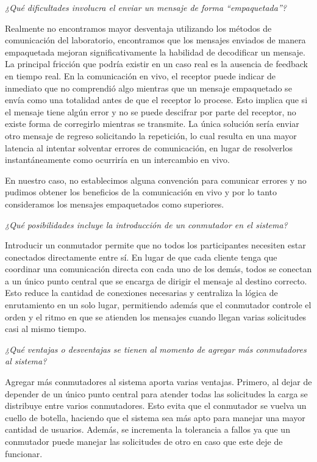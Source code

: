 \documentclass[11pt]{article}
\begin{document}
\textit{¿Qué dificultades involucra el enviar un mensaje de forma ``empaquetada''?}

Realmente no encontramos mayor desventaja utilizando los métodos de comunicación del laboratorio, encontramos que los mensajes enviados
de manera empaquetada mejoran significativamente la habilidad de decodificar un mensaje. La principal fricción que podría existir
en un caso real es la ausencia de feedback en tiempo real. En la comunicación en vivo, el receptor puede indicar de
inmediato que no comprendió algo mientras que un mensaje empaquetado se envía como una totalidad antes de que el receptor lo procese.
Esto implica que si el mensaje tiene algún error y no se puede descifrar por parte del receptor, no existe forma de corregirlo mientras se
transmite. La única solución sería enviar otro mensaje de regreso solicitando la repetición, lo
cual resulta en una mayor latencia al intentar solventar errores de comunicación, en lugar de resolverlos instantáneamente como ocurriría
en un intercambio en vivo.

En nuestro caso, no establecimos alguna convención para comunicar errores y no pudimos obtener los beneficios de la comunicación en vivo y por
lo tanto consideramos los mensajes empaquetados como superiores.


\textit{¿Qué posibilidades incluye la introducción de un conmutador en el sistema?}

Introducir un conmutador permite que no todos los participantes necesiten estar conectados directamente entre sí. En lugar de que
cada cliente tenga que coordinar una comunicación directa con cada uno de los demás, todos se conectan a un único punto central
que se encarga de dirigir el mensaje al destino correcto. Esto reduce la cantidad de conexiones necesarias 
y centraliza la lógica de enrutamiento en un solo lugar, permitiendo además que el conmutador controle el orden
y el ritmo en que se atienden los mensajes cuando llegan varias solicitudes casi al mismo tiempo.

\textit{¿Qué ventajas o desventajas se tienen al momento de agregar más conmutadores al sistema?}

Agregar más conmutadores al sistema aporta varias ventajas. Primero, al dejar de depender de un único punto central para atender
todas las solicitudes la carga se distribuye entre varios conmutadores. Esto evita que el conmutador se vuelva un cuello de botella, haciendo
que el sistema sea más apto para manejar una mayor cantidad de usuarios. Además, se incrementa la tolerancia a fallos ya que un conmutador
puede manejar las solicitudes de otro en caso que este deje de funcionar.
\end{document}
